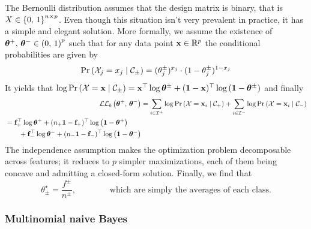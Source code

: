 The Bernoulli distribution assumes that the design matrix is binary,
that is $X \in \left\{ 0,\, 1 \right\}^{n \times p}$.
Even though this situation isn't very prevalent in practice, it has a simple and elegant solution.
More formally, we assume the existence of
$\bm{\theta}^+,\, \bm{\theta}^- \in \left( 0,\, 1 \right)^p$
such that for any data point $\mathbf{x} \in \mathbb{R}^p$ the conditional probabilities are given by
\begin{equation*}
    \Pr\left( \mathcal{X}_j = x_j \mid \mathcal{C}_\pm \right) = (\theta^\pm_j)^{x_j} \cdot (1 - \theta^\pm_j)^{1 - x_j}
\end{equation*}
It yields that $\log \Pr\left( \mathcal{X} = \mathbf{x} \mid \mathcal{C}_\pm \right) =
\mathbf{x}^\top\log\bm{\theta}^\pm + (\mathbf{1} - \mathbf{x})^\top\log\left( \mathbf{1} - \bm{\theta}^\pm \right)$
and finally
\begin{align}\label{eq:bernoulli_snb_ll}
\mathcal{L}\mathcal{L}_b\left( \bm{\theta}^+,\, \bm{\theta}^- \right)
&= \sum_{i \in \mathcal{I}^+} \log \Pr\left( \mathcal{X} = \mathbf{x}_i \mid \mathcal{C}_+ \right)
+ \sum_{i \in \mathcal{I}^-} \log \Pr\left( \mathcal{X} = \mathbf{x}_i \mid \mathcal{C}_- \right)\nonumber\\
\begin{split}
    &= \mathbf{f}_+^\top\log\bm{\theta}^+ + (n_+\mathbf{1} - \mathbf{f}_+)^\top\log\left( \mathbf{1} - \bm{\theta}^+ \right)\\
    &\qquad+ \mathbf{f}_-^\top\log\bm{\theta}^- + (n_-\mathbf{1} - \mathbf{f}_-)^\top\log\left( \mathbf{1} - \bm{\theta}^- \right)
\end{split}
\end{align}
The independence assumption makes the optimization problem decomposable across features;
it reduces to $p$ simpler maximizations, each of them being concave and admitting a closed-form solution.
Finally, we find that
\begin{equation*}
    \theta_\pm^\star = \frac{f^\pm}{n^\pm}
    ,\qquad\qquad
    \text{which are simply the averages of each class.}
\end{equation*}

\subsubsection{Multinomial naive Bayes}\label{subsubsec:mnb}

